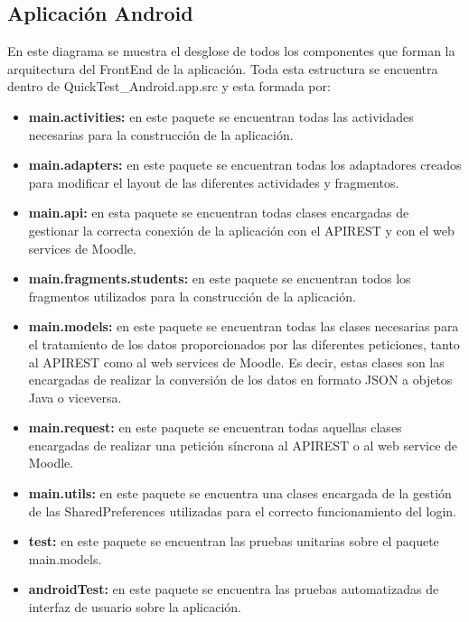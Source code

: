 \subsection{Aplicación Android}

En este diagrama se muestra el desglose de todos los componentes que forman la arquitectura del FrontEnd de la aplicación. Toda esta estructura se encuentra dentro de QuickTest\_Android.app.src y esta formada por:

\begin{itemize}

	\item \textbf{main.activities:} en este paquete se encuentran todas las actividades necesarias para la construcción de la aplicación.
	\item \textbf{main.adapters:} en este paquete se encuentran todas los adaptadores creados para modificar el layout de las diferentes actividades y fragmentos.
	\item \textbf{main.api:} en esta paquete se encuentran todas clases encargadas de gestionar la correcta conexión de la aplicación con el APIREST y con el web services de Moodle.
	\item \textbf{main.fragments.students:} en este paquete se encuentran todos los fragmentos utilizados para la construcción de la aplicación.
	\item \textbf{main.models:} en este paquete se encuentran todas las clases necesarias para el tratamiento de los datos proporcionados por las diferentes peticiones, tanto al APIREST como al web services de Moodle. Es decir, estas clases son las encargadas de realizar la conversión de los datos en formato JSON a objetos Java o viceversa.
	\item \textbf{main.request:} en este paquete se encuentran todas aquellas clases encargadas de realizar una petición síncrona al APIREST o al web service de Moodle.
	\item \textbf{main.utils:} en este paquete se encuentra una clases encargada de la gestión de las SharedPreferences utilizadas para el correcto funcionamiento del login.
	\item \textbf{test:} en este paquete se encuentran las pruebas unitarias sobre el paquete main.models.
	\item \textbf{androidTest:} en este paquete se encuentra las pruebas automatizadas de interfaz de usuario sobre la aplicación.

\end{itemize}

